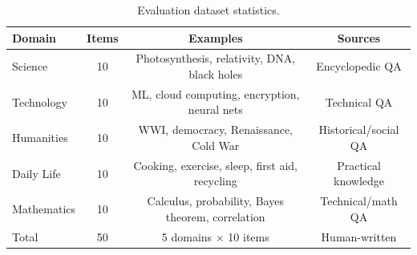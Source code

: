 \begin{table}[h]
\centering\small
\caption{Evaluation dataset statistics.}
\label{tab:items}
\begin{tabular}{lccc}
\toprule
Domain & Items & Examples & Sources \\
\midrule
Science & 10 & Photosynthesis, relativity, DNA, black holes & Encyclopedic QA \\
Technology & 10 & ML, cloud computing, encryption, neural nets & Technical QA \\
Humanities & 10 & WWI, democracy, Renaissance, Cold War & Historical/social QA \\
Daily Life & 10 & Cooking, exercise, sleep, first aid, recycling & Practical knowledge \\
Mathematics & 10 & Calculus, probability, Bayes theorem, correlation & Technical/math QA \\
\midrule
Total & 50 & 5 domains $\times$ 10 items & Human-written \\
\bottomrule
\end{tabular}
\end{table}
